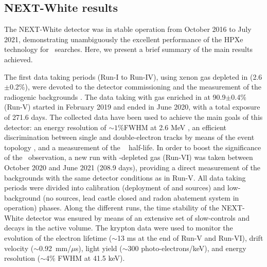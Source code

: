 \subsection{NEXT-White results}
\label{sec.new}


The NEXT-White detector \cite{NEXT:2018rgj} was in stable operation from October 2016 to July 2021, demonstrating unambiguously the excellent performance of the HPXe technology for \bbonu\ searches. Here, we present a brief summary of the main results achieved. 

\indent

The first data taking periods (Run-I to Run-IV), using xenon gas depleted in  (2.6$\pm$0.2\%), were devoted to the detector commissioning and the measurement of the radiogenic backgrounds \cite{NEXT:2018zho,Novella:2019cne}. The data taking with gas enriched in  at 90.9$\pm$0.4\% (Run-V) started in February 2019 and ended in June 2020, with a total exposure of 271.6 days. The collected data have been used to achieve the main goals of this detector: an energy resolution of $\sim1\%$FWHM at 2.6 MeV \cite{Renner:2019pfe}, an efficient discrimination between single and double-electron tracks by means of the event topology \cite{Ferrario:2019kwg,NEXT:2020jmz,NEXT:2021pjq}, and a measurement of the  \bbtnu~ half-life. In order to boost the significance of the \bbtnu ~observation, a new run with -depleted gas (Run-VI) was taken between October 2020 and June 2021 (208.9 days), providing a direct measurement of the backgrounds with the same detector conditions as in Run-V. All data taking periods were divided into calibration (deployment of  and  sources) and low-background (no sources, lead castle closed and radon abatement system in operation) phases. Along the different runs, the time stability of the NEXT-White detector was ensured by means of an extensive set of slow-controls and  decays in the active volume. The krypton data were used to monitor the evolution of the electron lifetime ($\sim$13 ms at the end of Run-V and Run-VI), drift velocity ($\sim$0.92~mm/$\mu$s), light yield ($\sim$300 photo-electrons/keV), and energy resolution ($\sim$4\% FWHM at 41.5 keV).      

\indent

